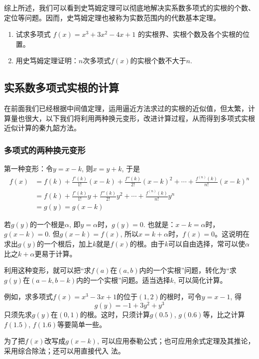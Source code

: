 综上所述，我们可以看到史笃姆定理可以彻底地解决实系数多项式的实根的个数、定位等问题。因而，史笃姆定理也被称为实数范围内的代数基本定理。

\begin{ex}
\begin{enumerate}
    \item 试求多项式 $f(x)=x^3+3x^2-4x+1$ 的实根界、实根个数及各个实根的位置。
    \item 用史笃姆定理证明：$n$次多项式$f(x)$的实根个数不大于$n$.
\end{enumerate}
\end{ex}

\subsection{实系数多项式实根的计算}

在前面我们已经根据中间值定理，运用逼近方法求过的实根的近似值，但太繁，计算量也很大，以下我们将利用两种换元变形，改进计算过程，从而得到多项式实根近似计算的秦九韶方法。

\subsubsection{多项式的两种换元变形}

第一种变形：令$y=x-k$, 则$x=y+k$, 于是
\[\begin{split}
    f(x)&=f(k)+\frac{f'(k)}{1!}(x-k)+\frac{f''(k)}{2!}(x-k)^2+\cdots +\frac{f^{(n)}(k)}{n!}(x-k)^n\\
    &=f(k)+\frac{f'(k)}{1!}y+\frac{f''(k)}{2!}y^2+\cdots +\frac{f^{(n)}(k)}{n!}y^n\\
    &=g(y)=g(x-k)
\end{split}\]

若$g(y)$的一个根是$\alpha$, 即$y=\alpha$时，$g(y)=0$. 也就是：$x-k=\alpha$时，$g(x-k)=0$. 但$g(x-k)=f(x)$, 所以$x=k+\alpha$时，$f(x)=0$。这说明在求出$g(y)$的一个根后，加上$k$就是$f(x)$的根。由于$k$可以自由选择，常可以使$\alpha$比之$k+\alpha$更易于计算。

利用这种变形，就可以把“求$f(a)$在$(a,b)$内的一个实根”问题，转化为“求$g(y)$在$(a-k,b-k)$内的一个实根”问题。适当选择$k$, 可以简化计算。

例如，求多项式$f (x) =x^3-3x+1$的位于$(1, 2)$的根时，可令$y=x-1$, 得
\[g (y) =-1+3y^2+y^3\]
只须先求$g(y)$在$(0, 1)$的根。这时，只须计算$g(0.5)$, $g(0.6)$等，比之计算$f(1. 5)$, $f(1. 6)$等要简单一些。

为了把$f(x)$改写成$g(x-k)$, 可以应用泰勒公式；也可应用余式定理及其推论，采用综合除法；还可以用直接代入
法。

